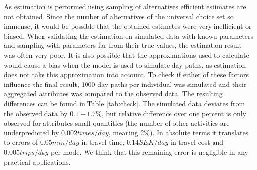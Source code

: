 
As estimation is performed using sampling of alternatives efficient estimates are not obtained. Since the number of alternatives of the universal choice set so immense, it would be possible that the obtained estimates were very inefficient or biased. When validating the estimation on simulated data with known parameters and sampling with parameters far from their true values, the estimation result was often very poor. It is also possible that the approximations used to calculate \aeutil would cause a bias when the model is used to simulate day-paths, as estimation does not take this approximation into account. To check if either of these factors influence the final result, 1000 day-paths per individual was simulated and their aggregated attributes was compared to the observed data. The resulting differences can be found in Table \ref{tab:check}. The simulated data deviates from the observed data by $0.1-1.7\%$, but relative difference over one percent is only observed for attributes small quantities (the number of other-activities are underpredicted by $0.002\unit{times/day}$, meaning 2$\%$). In absolute terms it translates to errors of $0.05\unit{min/day}$ in travel time, $0.14\unit{SEK/day}$ in travel cost and $0.005\unit{trips/day}$ per mode. We think that this remaining error is negligible in any practical applications. 


